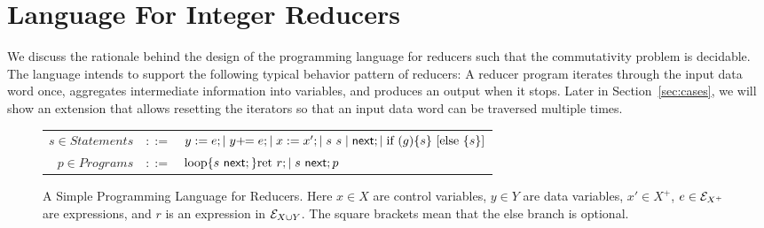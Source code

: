  
\section{Language For Integer Reducers}\label{sec-mr-prog}
\label{sec:language}
We discuss the rationale behind the design of the programming language for reducers such that the commutativity problem is decidable. The language intends to support the following typical behavior pattern of reducers: A reducer program iterates through the input data word once, aggregates intermediate information into variables, and produces an output when it stops. 
%
Later in Section~\ref{sec:cases}, we will show an extension that allows resetting the iterators so that an input data word can be traversed multiple times.

\begin{figure}
	\vspace{-0.5cm}
	\centering
	\begin{tabular}{rcl}
        $ s \in Statements$&$::=$&$y := e;\mid y +\!\!= e; \mid x:=x';\mid s\ s\mid \mathsf{next}; \mid \mbox{if } (g) \{s\} \mbox{ [else } \{s\}\mbox{]}$\\
		$ p\in Programs$&$::=$&$\loopL{s\ \nnext;}\mbox{ret }r; \mid s\ \nnext;p$		
	\end{tabular}
	\caption{A Simple Programming Language for Reducers. Here $x\in X$ are control variables, $y\in Y$ are data variables, $x' \in X^+$, $e\in {\mathcal{E} }_{X^+}$ are expressions, and $r$ is an expression in ${\mathcal{E} }_{X \cup Y}$. The square brackets mean that the else branch is optional.}
	\label{fig:language}
		\vspace{-0.5cm}
\end{figure}

